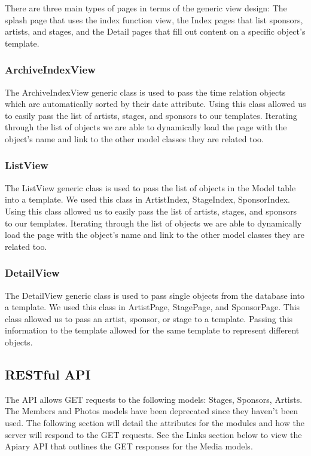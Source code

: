 \documentclass[12pt,english]{scrartcl}
\begin{document}
There are three main types of pages in terms of the 
generic view design: The splash page that uses the index function view, the Index pages that list
sponsors, artists, and stages, and the Detail pages that fill out content on a specific object's 
template.

\subsubsection{ArchiveIndexView}
The ArchiveIndexView generic class is used to pass the time relation objects which are automatically sorted 
by their date attribute. Using this class allowed us to easily pass the list of artists, stages, and sponsors to our templates.
Iterating through the list of objects we are able to dynamically load the page with the object's name and link to the other model classes they are related too.

\subsubsection{ListView}
The ListView generic class is used to pass the list of objects in the Model table into a template. We used this class in ArtistIndex, StageIndex, SponsorIndex.
Using this class allowed us to easily pass the list of artists, stages, and sponsors to our templates. Iterating through the list of objects we are able to dynamically
load the page with the object's name and link to the other model classes they are related too.

\subsubsection{DetailView}

The DetailView generic class is used to pass single objects from the database into a template. We used this
class in ArtistPage, StagePage, and SponsorPage. This class allowed us to pass an artist, sponsor, or stage to a template. Passing this information to the template allowed for the same template to represent different objects.

\subsection{RESTful  API}

The API allows GET requests to the following models: Stages, Sponsors, Artists. The  Members and Photos models have been deprecated since they haven't been used.
The following section will detail the attributes for the modules and how the server will respond to the GET requests. See 
the Links section below to view the Apiary API that outlines the GET responses for the Media models.
\end{document}
